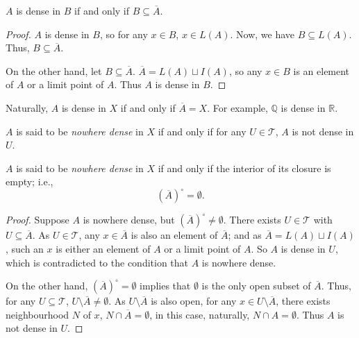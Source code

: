 \begin{proposition}
	$A$ is dense in $B$ if and only if $B \subseteq \overline{A}$.
	
	\begin{proof}
		$A$ is dense in $B$, so for any $x \in B$, $x \in L(A)$. Now, we have $B \subseteq L(A)$. Thus, $B \subseteq \overline A$.
		
		On the other hand, let $B \subseteq \overline A$. $\overline A = L(A) \sqcup I(A)$, so any $x \in B$ is an element of $A$ or a limit point of $A$. Thus $A$ is dense in $B$.
	\end{proof}
\end{proposition}


\begin{note}
	Naturally, $A$ is dense in $X$ if and only if $\overline A = X$. For example, $\mathbb Q$ is dense in $\mathbb R$.
\end{note}


\begin{definition}
	$A$ is said to be \textit{nowhere dense} in $X$ if and only if for any $U \in \mathcal T$, $A$ is not dense in $U$.
\end{definition}


\begin{proposition}
	$A$ is said to be \textit{nowhere dense} in $X$ if and only if the interior of its closure is empty; i.e.,
	$$
	(\overline A)^\circ = \emptyset.
	$$
	
	\begin{proof}
		Suppose $A$ is nowhere dense, but $(\overline A)^\circ \ne \emptyset$. There exists $U \in \mathcal T$ with $U \subseteq \overline A$. As $U \in \mathcal T$, any $x \in \overline A$ is also an element of $\overline A$; and as $\overline A = L(A) \sqcup I(A)$, such an $x$ is either an element of $A$ or a limit point of $A$. So $A$ is dense in $U$, which is contradicted to the condition that $A$ is nowhere dense.
		
		On the other hand, $(\overline A)^\circ = \emptyset$ implies that $\emptyset$ is the only open subset of $\overline A$. Thus, for any $U \subseteq \mathcal T$, $U \setminus \overline A \ne \emptyset$. As $U \setminus \overline A$ is also open, for any $x \in U \setminus \overline A$, there exists neighbourhood $N$ of $x$, $N \cap \overline A = \emptyset$, in this case, naturally, $N \cap A = \emptyset$. Thus $A$ is not dense in $U$.
	\end{proof}
\end{proposition}


